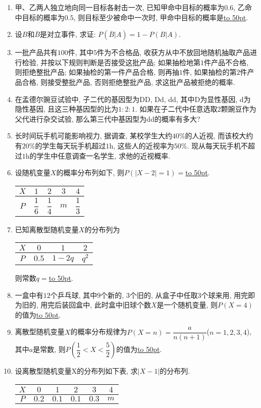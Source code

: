 \documentclass[10pt,a4paper]{article}
\newcommand{\blank}[1]{\underline{\hbox to #1pt{}}}
\begin{document}
\begin{enumerate}[1.]
\item 甲、乙两人独立地向同一目标各射击一次, 已知甲命中目标的概率为$0.6$, 乙命中目标的概率为$0.5$, 则目标至少被命中一次时, 甲命中目标的概率是\blank{50}.
\item 设$B$和$\overline B$是对立事件, 求证: $P(\overline B|A)=1-P(B|A)$.
\item 一批产品共有$100$件, 其中$5$件为不合格品, 收获方从中不放回地随机抽取产品进行检验, 并按以下规则判断是否接受这批产品; 如果抽检地第$1$件产品不合格, 则拒绝整批产品; 如果抽检的第一件产品合格, 则再抽$1$件, 如果抽检的第$2$件产品合格, 则接受整批产品, 否则拒绝整批产品, 求这批产品被拒绝的概率.
\item 在孟德尔豌豆试验中, 子二代的基因型为DD, Dd, dd, 其中D为显性基因, d为隐性基因, 且这三种基因型的比为$1: 2: 1$. 如果在子二代中任意选取$2$颗豌豆作为父代进行杂交试验, 那么第三代中基因型为dd的概率有多大?
\item 长时间玩手机可能影响视力, 据调查, 某校学生大约$40\%$的人近视, 而该校大约有$20\%$的学生每天玩手机超过$1\text{h}$, 这些人的近视率为$50\%$. 现从每天玩手机不超过$1\text{h}$的学生中任意调查一名学生, 求他的近视概率.
\item 设随机变量$X$的概率分布列如下, 则$P(|X-2|=1)=$\blank{50}.
\begin{center}
    \begin{tabular}{|c|c|c|c|c|}
        \hline
        $X$ & $1$ & $2$ & $3$ & $4$\\ \hline
        $P$ & $\dfrac 16$ & $\dfrac 14$ & $m$ & $\dfrac 13$\\ \hline       
    \end{tabular}
\end{center}
\item 已知离散型随机变量$X$的分布列为
\begin{center}
    \begin{tabular}{|c|c|c|c|}
        \hline
        $X$ & $0$ & $1$ & $2$ \\ \hline
        $P$ & $0.5$ & $1-2q$ & $q^2$ \\ \hline
    \end{tabular}
\end{center}
则常数$q=$\blank{50}.
\item 一盒中有$12$个乒乓球, 其中$9$个新的, $3$个旧的, 从盒子中任取$3$个球来用, 用完即为旧的, 用完后装回盒中, 此时盒中旧球个数$X$是一个随机变量, 则$P(X=4)$的值为\blank{50}.
\item 离散型随机变量$X$的概率分布规律为$P(X=n)=\dfrac{a}{n(n+1)}$($n=1, 2, 3, 4$), 其中$a$是常数, 则$P(\dfrac 12<X<\dfrac 52)$的值为\blank{50}.
\item 设离散型随机变量X的分布列如下表, 求$|X-1|$的分布列.
\begin{center}
    \begin{tabular}{|c|c|c|c|c|c|}
        \hline
        $X$	& $0$ & $1$ & $2$ & $3$ & $4$ \\ \hline
        $P$	& $0.2$ & $0.1$ & $0.1$ & $0.3$ & $m$ \\ \hline
    \end{tabular}
\end{center}


\end{enumerate}
\end{document}
